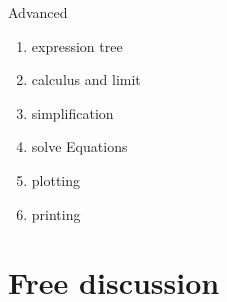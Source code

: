 \documentclass[english, nochinese]{../TeXTemplate/pkuslide}
\begin{document}
\begin{frame}{Advanced}
\begin{enumerate}
\item expression tree
\item calculus and limit
\item simplification
\item solve Equations
\item plotting
\item printing
\end{enumerate}
\end{frame}

\section{Free discussion}

\begin{frame}
\sectionpage
\end{frame}
\end{document}
